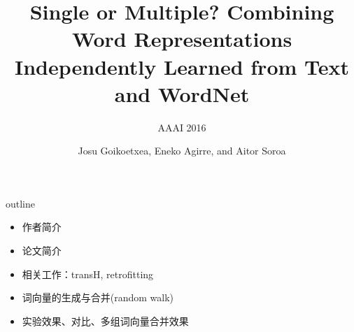 \documentclass[color=usenames,dvipsnames]{beamer}
\title[Text+WordNet Embed]{Single or Multiple? Combining Word Representations Independently Learned from Text and WordNet\vspace{0.2cm}}
\subtitle{AAAI 2016}
\author[韩喆]{Josu Goikoetxea, Eneko Agirre, and Aitor Soroa}
\institute[ICSTWIP]{巴斯克大学}
\date[20160308]{}
\begin{document}
\begin{frame}
  \titlepage
\end{frame}


\begin{frame}{outline}
 \begin{itemize}
  \item 作者简介
  \item 论文简介
  \item 相关工作：transH, retrofitting 
  \item 词向量的生成与合并(random walk)
  \item 实验效果、对比、多组词向量合并效果
 \end{itemize}
\end{frame}
\end{document}
